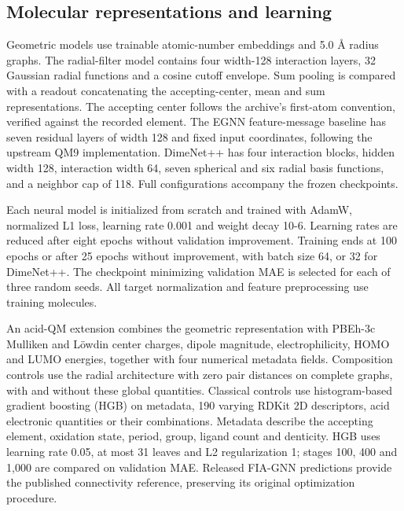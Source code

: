 \subsection{Molecular representations and learning}

Geometric models use trainable atomic-number embeddings and 5.0 Å radius graphs. The radial-filter model contains four width-128 interaction layers, 32 Gaussian radial functions and a cosine cutoff envelope. \cite{schutt2017schnet} Sum pooling is compared with a readout concatenating the accepting-center, mean and sum representations. The accepting center follows the archive's first-atom convention, verified against the recorded element. The EGNN feature-message baseline has seven residual layers of width 128 and fixed input coordinates, following the upstream QM9 implementation. \cite{satorras2021egnn} DimeNet++ has four interaction blocks, hidden width 128, interaction width 64, seven spherical and six radial basis functions, and a neighbor cap of 118. \cite{gasteiger2020dimenet} Full configurations accompany the frozen checkpoints.

Each neural model is initialized from scratch and trained with AdamW, normalized L1 loss, learning rate 0.001 and weight decay 10-6. Learning rates are reduced after eight epochs without validation improvement. Training ends at 100 epochs or after 25 epochs without improvement, with batch size 64, or 32 for DimeNet++. The checkpoint minimizing validation MAE is selected for each of three random seeds. All target normalization and feature preprocessing use training molecules.

An acid-QM extension combines the geometric representation with PBEh-3c Mulliken and Löwdin center charges, dipole magnitude, electrophilicity, HOMO and LUMO energies, together with four numerical metadata fields. Composition controls use the radial architecture with zero pair distances on complete graphs, with and without these global quantities. Classical controls use histogram-based gradient boosting (HGB) on metadata, 190 varying RDKit 2D descriptors, acid electronic quantities or their combinations. \cite{rdkit,pedregosa2011sklearn} Metadata describe the accepting element, oxidation state, period, group, ligand count and denticity. HGB uses learning rate 0.05, at most 31 leaves and L2 regularization 1; stages 100, 400 and 1,000 are compared on validation MAE. Released FIA-GNN predictions provide the published connectivity reference, preserving its original optimization procedure. \cite{fia49kpredictions}

